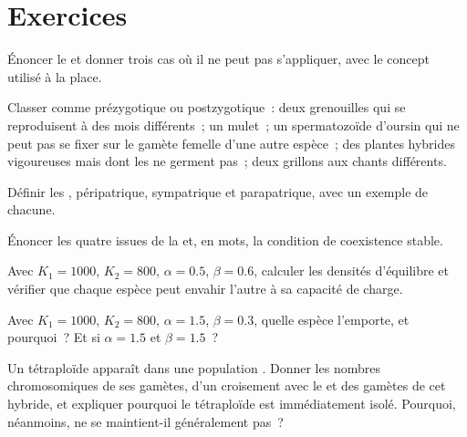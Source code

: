 \section{Exercices}

\begin{exercise}[$\star$]\label{exo:b2:speciation:1}
Énoncer le  et donner trois cas où il ne
peut pas s'appliquer, avec le concept utilisé à la place.
\end{exercise}

\begin{exercise}[$\star$]\label{exo:b2:speciation:2}
Classer comme prézygotique ou postzygotique~: deux grenouilles qui se
reproduisent à des mois différents~; un mulet~; un spermatozoïde d'oursin
qui ne peut pas se fixer sur le gamète femelle d'une autre espèce~; des plantes
hybrides vigoureuses mais dont les  ne germent pas~; deux grillons
aux chants différents.
\end{exercise}

\begin{exercise}[$\star$]\label{exo:b2:speciation:3}
Définir les , péripatrique, sympatrique et
parapatrique, avec un exemple de chacune.
\end{exercise}

\begin{exercise}[$\star$]\label{exo:b2:speciation:4}
Énoncer les quatre issues de la  et, en
mots, la condition de coexistence stable.
\end{exercise}

\begin{exercise}[$\star\star$]\label{exo:b2:speciation:5}
Avec $K_1 = 1000$, $K_2 = 800$, $\alpha = 0.5$, $\beta = 0.6$,
calculer les densités d'équilibre et vérifier que chaque espèce peut
envahir l'autre à sa capacité de charge.
\end{exercise}

\begin{exercise}[$\star\star$]\label{exo:b2:speciation:6}
Avec $K_1 = 1000$, $K_2 = 800$, $\alpha = 1.5$, $\beta = 0.3$, quelle
espèce l'emporte, et pourquoi~? Et si $\alpha = 1.5$ et $\beta = 1.5$~?
\end{exercise}

\begin{exercise}[$\star\star$]\label{exo:b2:speciation:7}
Un tétraploïde apparaît dans une population . Donner les nombres
chromosomiques de ses gamètes, d'un croisement avec le  et des
gamètes de cet hybride, et expliquer pourquoi le tétraploïde est
immédiatement isolé. Pourquoi, néanmoins, ne se maintient-il
généralement pas~?
\end{exercise}

